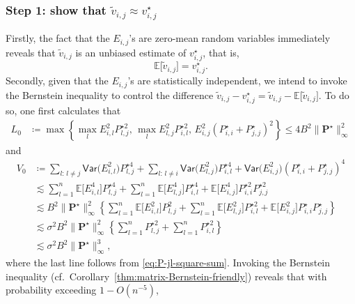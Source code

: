 \subsubsection{Step 1: show that $\widetilde{v}_{i,j}\approx {v}^{\star}_{i,j}$} 
%
Firstly, the fact that the $E_{i,j}$'s are zero-mean random variables
immediately reveals that $\widetilde{v}_{i,j}$ is an unbiased estimate
of $v_{i,j}^{\star}$, that is, 
%
\[
\mathbb{E}\big[\widetilde{v}_{i,j}\big]=v_{i,j}^{\star}.
\]
%
Secondly, given that the $E_{i,j}$'s are statistically independent,
we intend to invoke the Bernstein inequality to control the difference $\widetilde{v}_{i,j}-v_{i,j}^{\star}=\widetilde{v}_{i,j}-\mathbb{E}\big[\widetilde{v}_{i,j}\big]$.
To do so, one first calculates that
%
\begin{align*}
L_{0} & \coloneqq\max\left\{ \max_{l}E_{i,l}^{2}P_{l,j}^{\star 2},\,\max_{l}E_{l,j}^{2}P_{i,l}^{\star 2},\,E_{i,j}^{2}(P_{i,i}^\star +P_{j,j}^\star )^{2}\right\} \leq4B^{2}\|\bm{P}^\star \|_{\infty}^{2}
\end{align*}
%
and
\begin{align*}
V_{0} & \coloneqq\sum_{l:\,l\neq j}\mathsf{Var}\big(E_{i,l}^{2}\big)P_{l,j}^{\star 4}+\sum_{l:\,l\neq i}\mathsf{Var}\big(E_{l,j}^{2}\big)P_{i,l}^{\star 4}+\mathsf{Var}\big(E_{i,j}^{2}\big)(P_{i,i}^\star +P_{j,j}^\star )^{4}\\
 & \lesssim\sum_{l=1}^{n}\mathbb{E}\big[E_{i,l}^{4}\big]P_{l,j}^{\star 4}+\sum_{l=1}^{n}\mathbb{E}\big[E_{l,j}^{4}\big]P_{i,l}^{\star 4}+\mathbb{E}\big[E_{i,j}^{4}\big]P_{i,i}^{\star 2}P_{j,j}^{\star 2}\\
 & \lesssim B^{2}\|\bm{P}^\star \|_{\infty}^{2}\left\{ \sum_{l=1}^{n}\mathbb{E}\big[E_{i,l}^{2}\big]P_{l,j}^{2}+\sum_{l=1}^{n}\mathbb{E}\big[E_{l,j}^{2}\big]P_{i,l}^{\star 2}+\mathbb{E}\big[E_{i,j}^{2}\big]P_{i,i}^\star P_{j,j}^\star \right\} \\
 & \lesssim \sigma^{2} B^{2} \|\bm{P}^\star \|_{\infty}^{2}\left\{ \sum_{l=1}^{n}P_{l,j}^{\star 2}+\sum_{l=1}^{n}P_{i,l}^{\star 2}\right\} \\
 & \lesssim \sigma^{2} B^{2} \|\bm{P}^\star \|_{\infty}^{3},
\end{align*}
%
where the last line follows from \eqref{eq:P-jl-square-sum}. 
%
Invoking the Bernstein inequality (cf.~Corollary~\ref{thm:matrix-Bernstein-friendly}) reveals that with probability exceeding $1-O(n^{-5})$, 

